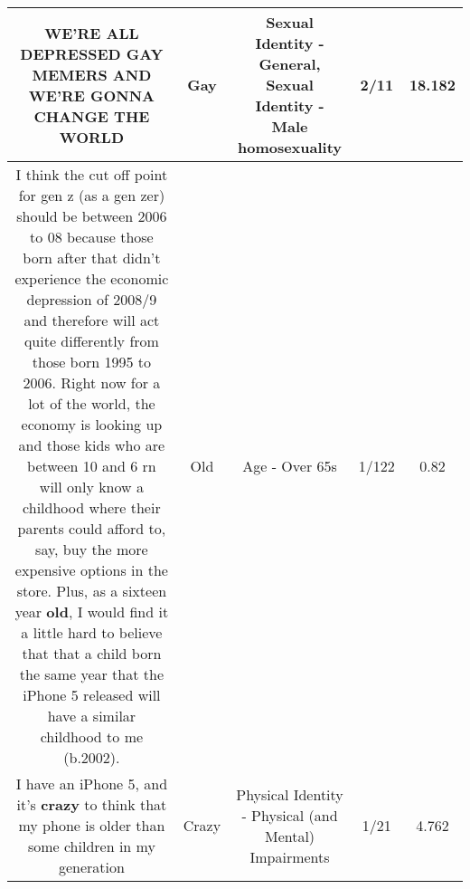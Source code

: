 \documentclass[11pt]{article}
\newlength\mylength
\begin{document}
\begin{center}
\begin{longtable}{|C{.65\mylength}|C{.30\mylength}|C{.12\mylength}|C{.12\mylength}|C{.12\mylength}|}
  \small WE'RE ALL DEPRESSED \textbf{G\textbf{AY}} MEMERS AND WE'RE GONNA CHANGE THE WORLD\normalsize   & Gay & Sexual Identity - General, Sexual Identity - Male homosexuality & 2/11 & 18.182 \\  \hline
  \small I think the cut off point for gen z (as a gen zer) should be between 2006 to 08 because those born after that didn't experience the economic depression of 2008/9 and therefore will act quite differently from those born 1995 to 2006. Right now for a lot of the world, the economy is looking up and those kids who are between 10 and 6 rn will only know a childhood where their parents could afford to, say, buy the more expensive options in the store. Plus, as a sixteen year \textbf{old}, I would find it a little hard to believe that that a child born the same year that the iPhone 5 released will have a similar childhood to me (b.2002).\normalsize   & Old & Age - Over 65s & 1/122 & 0.82 \\  \hline
  \small I have an iPhone 5, and it's \textbf{crazy} to think that my phone is older than some children in my generation\normalsize   & Crazy & Physical Identity - Physical (and Mental) Impairments & 1/21 & 4.762 \\  \hline

\end{longtable}
\end{center}
\end{document}
